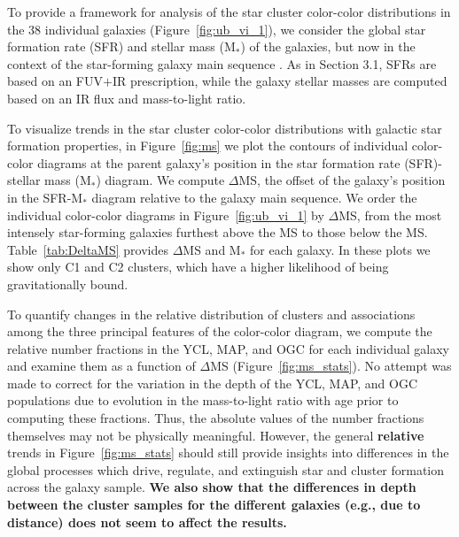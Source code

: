 \documentclass[linenumbers]{aastex63}
\begin{document}
To provide a framework for analysis of the star cluster color-color distributions in the 38 individual galaxies (Figure~\ref{fig:ub_vi_1}), we consider the global star formation rate (SFR) and stellar mass (M$_*$) of the galaxies, but now in the context of the star-forming galaxy main sequence \citep[e.g.,][]{salim_uv_2007, noeske_star_2007, lee_star_2007,peng_mass_2010}.  As in Section 3.1, SFRs are based on an FUV$+$IR prescription, while the galaxy stellar masses are computed based on an IR flux and mass-to-light ratio.

To visualize trends in the star cluster color-color distributions with galactic star formation properties, in  Figure~\ref{fig:ms} we plot the contours of individual color-color diagrams at the parent galaxy’s position in the star formation rate (SFR)-stellar mass (M$_*$) diagram.  We compute $\Delta$MS, the offset of the galaxy's position in the SFR-M$_*$ diagram relative to the galaxy main sequence.   We order the individual color-color diagrams in Figure~\ref{fig:ub_vi_1} by $\Delta$MS, from the most intensely star-forming galaxies furthest above the MS to those below the MS.  Table~\ref{tab:DeltaMS} provides $\Delta$MS and M$_*$ for each galaxy.  In these plots we show only C1 and C2 clusters, which have a higher likelihood of being gravitationally bound.  

To quantify changes in the relative distribution of clusters and associations among the three principal features of the color-color diagram, we compute the relative number fractions in the YCL, MAP, and OGC for each individual galaxy and examine them as a function of $\Delta$MS (Figure~\ref{fig:ms_stats}). No attempt was made to correct for the variation in the depth of the YCL, MAP, and OGC populations due to evolution in the mass-to-light ratio with age prior to computing these fractions.  Thus, the absolute values of the number fractions themselves may not be physically meaningful.  However, the general 
\textbf{relative} trends in Figure~\ref{fig:ms_stats} should still provide insights into differences in the global processes which drive, regulate, and extinguish star and cluster formation across the galaxy sample.  \textbf{We also show that the differences in depth between the cluster samples for the different galaxies (e.g., due to distance) does not seem to affect the results.}
 
\end{document}
